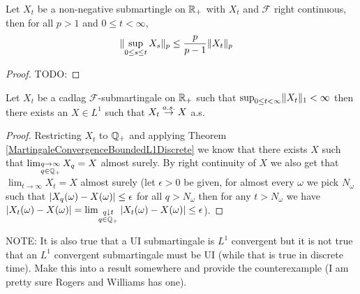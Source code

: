 \begin{lem}\label{DoobLpInequalityContinuous}Let $X_t$ be a
  non-negative submartingle on $\mathbb{R}_+$ with $X_t$ and $\mathcal{F}$ right continuous, then for all
  $p > 1$ and $0 \leq t < \infty$,
\begin{align*}
\lVert \sup_{0 \leq s \leq t} X_s \rVert_p &\leq \frac{p}{p-1}\lVert X_t \rVert_p
\end{align*}
\end{lem}
\begin{proof}
TODO:
\end{proof}

\begin{thm}\label{MartingaleConvergenceBoundedL1Continuous}Let $X_t$ be a cadlag
  $\mathcal{F}$-submartingale on $\mathbb{R}_+$ such that $\sup_{0 \leq t
    < \infty} \lVert X_t \rVert_1 <
  \infty$ then there exists an $X \in L^1$ such that $X_t \overset{a.s.}\to X$ a.s.
\end{thm}
\begin{proof}
Restricting $X_t$ to $\mathbb{Q}_+$ and applying Theorem
\ref{MartingaleConvergenceBoundedL1Discrete} we know that there
exists $X$ such that $\lim_{\substack{q \to \infty \\ q \in
    \mathbb{Q}_+}} X_q = X$ almost surely.  By right continuity of $X$
we also get that $\lim_{t \to \infty} X_t = X$ almost surely (let
$\epsilon > 0$ be given, for
almost every $\omega$ we pick $N_\omega$ such that $\left \vert X_q(\omega) -
  X(\omega) \right \vert \leq \epsilon$ for all $q > N_\omega$ then for any $t >
N_\omega$ we have $\left \vert X_t(\omega) -
  X(\omega) \right \vert = \lim_{\substack{q \downarrow t \\ q \in \mathbb{Q}_+}} \left \vert X_t(\omega) -
  X(\omega) \right \vert \leq \epsilon$).
\end{proof}


NOTE: It is also true that a UI submartingale is $L^1$ convergent
but it is not true that an $L^1$ convergent submartingale must be
UI (while that is true in discrete time).  Make this into a result
somewhere and provide the counterexample (I am pretty sure Rogers and
Williams has one).

